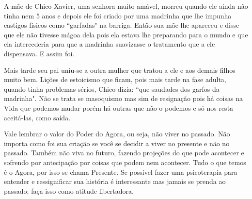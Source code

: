 \emdash{}A mãe de Chico Xavier, uma senhora muito amável, morreu quando ele ainda não tinha nem 5 anos e depois ele foi criado por uma madrinha que lhe impunha castigos físicos como ``garfadas" na barriga. Então sua mãe lhe apareceu e disse que ele não tivesse mágoa dela pois ela estava lhe preparando para o mundo e que ela intercederia para que a madrinha suavizasse o tratamento que a ele dispensava. E assim foi.

\emdash{}Mais tarde seu pai uniu-se a outra mulher que tratou a ele e aos demais filhos muito bem. Lições de estoicismo que ficam, pois mais tarde na fase adulta, quando tinha problemas sérios, Chico dizia: ``que saudades dos garfos da madrinha". Não se trata se masoquismo mas sim de resignação pois há coisas na Vida que podemos mudar porém há outras que não o podemos e só nos resta aceitá-las, como saída.

\emdash{}Vale lembrar o valor do Poder do Agora, ou seja, não viver no passado. Não importa como foi sua criação se você se decidir a viver no presente e não no passado. Também não viva no futuro, fazendo projeções do que pode acontecer e sofrendo por antecipação por coisas que podem nem acontecer. Tudo o que temos é o Agora, por isso se chama Presente. Se possível fazer uma psicoterapia para entender e ressignificar sua história é interessante mas jamais se prenda ao passado; faça isso como atitude libertadora.
